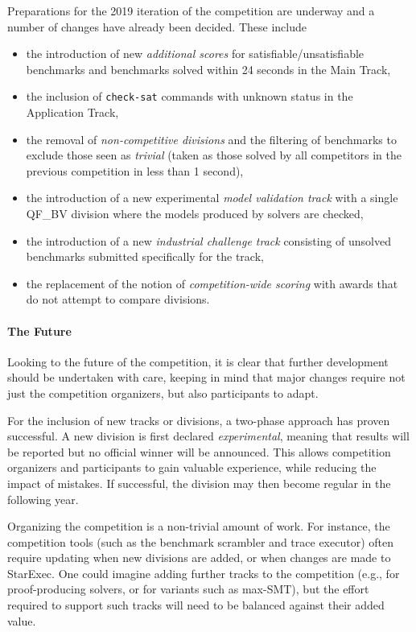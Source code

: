 \documentclass[dvipsnames,table,twoside,11pt]{article}
\newcommand{\maintrack}{Main Track\xspace}
\newcommand{\apptrack}{Application Track\xspace}
\begin{document}
Preparations for the 2019 iteration of the competition are underway and a number of changes have already been decided. These include

\begin{itemize}
  \item the introduction of new \emph{additional scores} for
    satisfiable/unsatisfiable benchmarks and benchmarks solved within 24
    seconds in the \maintrack,
	\item the inclusion of {\tt check-sat} commands with unknown status in
  the \apptrack,
  \item the removal of \emph{non-competitive divisions} and the filtering of
    benchmarks to exclude those seen as \emph{trivial} (taken as those solved
    by all competitors in the previous competition in less than 1 second),
  \item the introduction of a new experimental \emph{model validation track}
    with a single QF\_BV division where the models produced by solvers are
    checked,
  \item the introduction of a new \emph{industrial challenge track} consisting
    of unsolved benchmarks submitted specifically for the track,
  \item the replacement of the notion of \emph{competition-wide scoring} with
    awards that do not attempt to compare divisions.
\end{itemize}



\paragraph{The Future}

Looking to the future of the competition, it is clear that further development should be undertaken with care,
keeping in mind that major changes require not just the competition
organizers, but also participants to adapt.

For the inclusion of new tracks or divisions, a two-phase approach has
proven successful.  A new division is first declared
\emph{experimental}, meaning that results will be reported but no
official winner will be announced.  This allows competition organizers
and participants to gain valuable experience, while reducing the
impact of mistakes.  If successful, the division may then become
regular in the following year.

Organizing the competition is a non-trivial amount of work.  For
instance, the competition tools (such as the benchmark scrambler and
trace executor) often require updating when new divisions are added,
or when changes are made to StarExec.  One could imagine adding
further tracks to the competition (e.g., for proof-producing solvers,
or for variants such as max-SMT), but the effort required to support
such tracks will need to be balanced against their added value.
\end{document}
